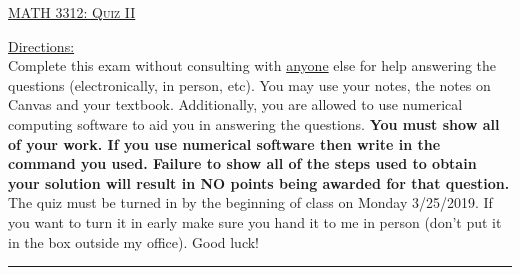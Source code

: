 \documentclass[10pt, a4paper]{article}
\theoremstyle{break}
\begin{document}
\begin{center}
{\large \textsc{\underline{MATH 3312: Quiz II}}}
\vspace{0.125in}
\end{center}
\underline{Directions:} \\
Complete this exam without consulting with \underline{anyone} else for help answering the questions (electronically, in person, etc). You may use your notes, the notes on Canvas and your textbook. Additionally, you are allowed to use numerical computing software to aid you in answering the questions. \textbf{You must show all of your work. If you use numerical software then write in the command you used. Failure to show all of the steps used to obtain your solution will result in NO points being awarded for that question. } 
\noindent The quiz must be turned in by the beginning of class on Monday 3/25/2019. If you want to turn it in early make sure you hand it to me in person (don't put it in the box outside my office). Good luck! \\
\noindent\rule{15cm}{0.4pt}

\vspace{0.25in}
\end{document}
